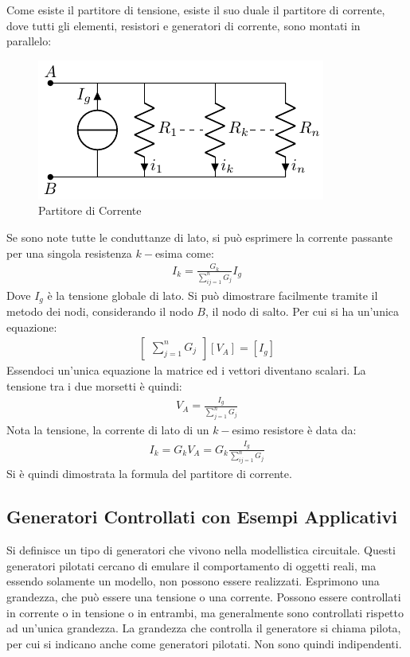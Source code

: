 \documentclass{article}
\numberwithin{equation}{subsection}
\begin{document}
Come esiste il partitore di tensione, esiste il suo duale il partitore di corrente, dove tutti gli elementi, resistori e generatori di corrente, sono montati in parallelo:
\begin{figure}[H]%
    \centering
    \includegraphics{partitore-corrente.pdf}
    \caption{Partitore di Corrente}
    \label{fig:partitore-corrente}
\end{figure}
Se sono note tutte le conduttanze di lato, si può esprimere la corrente passante per una singola resistenza $k-$esima come:
\begin{gather*}
    I_k=\displaystyle\frac{G_k}{\sum_{ij=1}^n G_j}I_g
\end{gather*}
Dove $I_g$ è la tensione globale di lato. 
Si può dimostrare facilmente tramite il metodo dei nodi, considerando il nodo $B$, il nodo di salto. Per cui si ha un'unica equazione:
\begin{gather*}
    \begin{bmatrix}
        \displaystyle\sum_{j=1}^nG_j
    \end{bmatrix}[V_A]=[I_g]
\end{gather*}
Essendoci un'unica equazione la matrice ed i vettori diventano scalari. La tensione tra i due morsetti è quindi:
\begin{gather*}
    V_A=\displaystyle\frac{I_g}{\sum_{j=1}^nG_j}
\end{gather*} 
Nota la tensione, la corrente di lato di un $k-$esimo resistore è data da:
\begin{gather*}
    I_k=G_kV_A=\displaystyle G_k\frac{I_g}{\sum_{ij=1}^n G_j}
\end{gather*}
Si è quindi dimostrata la formula del partitore di corrente. 

\subsection{Generatori Controllati con Esempi Applicativi}

Si definisce un tipo di generatori che vivono nella modellistica circuitale. Questi generatori pilotati cercano di emulare il comportamento di oggetti reali, ma essendo 
solamente un modello, non possono essere realizzati. 
Esprimono una grandezza, che può essere una tensione o una corrente. Possono essere controllati in corrente o in tensione o in entrambi, ma generalmente sono controllati 
rispetto ad un'unica grandezza. La grandezza che controlla il generatore si chiama pilota, per cui si indicano anche come generatori pilotati. Non sono quindi indipendenti. 
\end{document}
